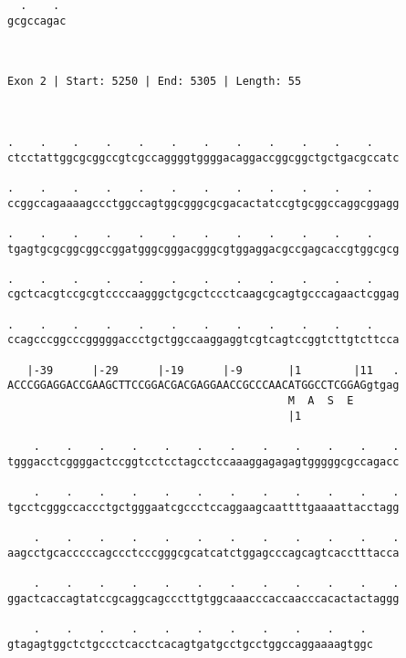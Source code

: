 \documentclass{article}
\begin{document}
\begin{Verbatim}
  .    . 
gcgccagac
         
         
 
Exon 2 | Start: 5250 | End: 5305 | Length: 55



.    .    .    .    .    .    .    .    .    .    .    .    
ctcctattggcgcggccgtcgccaggggtggggacaggaccggcggctgctgacgccatc
                                                            
.    .    .    .    .    .    .    .    .    .    .    .    
ccggccagaaaagccctggccagtggcgggcgcgacactatccgtgcggccaggcggagg
                                                            
.    .    .    .    .    .    .    .    .    .    .    .    
tgagtgcgcggcggccggatgggcgggacgggcgtggaggacgccgagcaccgtggcgcg
                                                            
.    .    .    .    .    .    .    .    .    .    .    .    
cgctcacgtccgcgtccccaagggctgcgctccctcaagcgcagtgcccagaactcggag
                                                            
.    .    .    .    .    .    .    .    .    .    .    .    
ccagcccggcccgggggaccctgctggccaaggaggtcgtcagtccggtcttgtcttcca
                                                            
   |-39      |-29      |-19      |-9       |1        |11   .
ACCCGGAGGACCGAAGCTTCCGGACGACGAGGAACCGCCCAACATGGCCTCGGAGgtgag
                                           M  A  S  E       
                                           |1               
  
    .    .    .    .    .    .    .    .    .    .    .    .
tgggacctcggggactccggtcctcctagcctccaaaggagagagtgggggcgccagacc
                                                            
    .    .    .    .    .    .    .    .    .    .    .    .
tgcctcgggccaccctgctgggaatcgccctccaggaagcaattttgaaaattacctagg
                                                            
    .    .    .    .    .    .    .    .    .    .    .    .
aagcctgcacccccagccctcccgggcgcatcatctggagcccagcagtcacctttacca
                                                            
    .    .    .    .    .    .    .    .    .    .    .    .
ggactcaccagtatccgcaggcagcccttgtggcaaacccaccaacccacactactaggg
                                                            
    .    .    .    .    .    .    .    .    .    .    . 
gtagagtggctctgccctcacctcacagtgatgcctgcctggccaggaaaagtggc
                                                        

\end{Verbatim}
\end{document}
